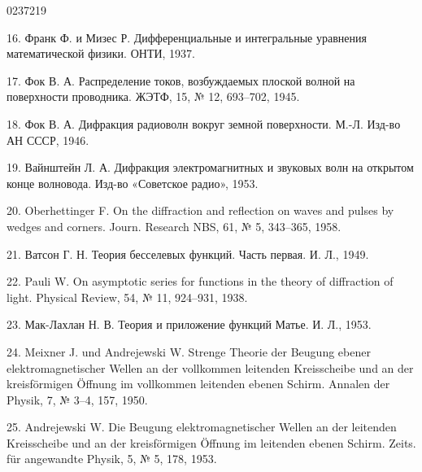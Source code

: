 \begin{scanpage}{0237}{219}
{16. Франк Ф. и Мизес Р. Дифференциальные и интегральные уравнения математической физики. ОНТИ, 1937.\par
17. Фок В. А. Распределение токов, возбуждаемых плоской волной на поверхности проводника. ЖЭТФ, 15, № 12, 693--702, 1945.\par
18. Фок В. А. Дифракция радиоволн вокруг земной поверхности. М.-Л. Изд-во АН СССР, 1946.\par
19. Вайнштейн Л. А. Дифракция электромагнитных и звуковых волн на открытом конце волновода. Изд-во «Советское радио», 1953.\par
20. Oberhettinger F. On the diffraction and reflection on waves and pulses by wedges and corners. Journ. Research NBS, 61, № 5, 343--365, 1958.\par
21. Ватсон Г. Н. Теория бесселевых функций. Часть первая. И. Л., 1949.\par
22. Pauli W. On asymptotic series for functions in the theory of diffraction of light. Physical Review, 54, № 11, 924--931, 1938.\par
23. Мак-Лахлан Н. В. Теория и приложение функций Матье. И. Л., 1953.\par
24. Meixner J. und Andrejewski W. Strenge Theorie der Beugung ebener elektromagnetischer Wellen an der vollkommen leitenden Kreisscheibe und an der kreisförmigen Öffnung im vollkommen leitenden ebenen Schirm. Annalen der Physik, 7, № 3--4, 157, 1950.\par
25. Andrejewski W. Die Beugung elektromagnetischer Wellen an der leitenden Kreisscheibe und an der kreisförmigen Öffnung im leitenden ebenen Schirm. Zeits. für angewandte Physik, 5, № 5, 178, 1953.\par}
\end{scanpage}
